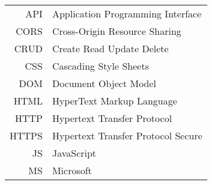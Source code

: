\begin{longtable}{rl}
API & Application Programming Interface\\
CORS & Cross-Origin Resource Sharing\\
CRUD & Create Read Update Delete\\
CSS & Cascading Style Sheets\\
DOM & Document Object Model\\
HTML & HyperText Markup Language\\
HTTP & Hypertext Transfer Protocol\\
HTTPS & Hypertext Transfer Protocol Secure\\
JS & JavaScript\\
MS & Microsoft\\

\end{longtable}
